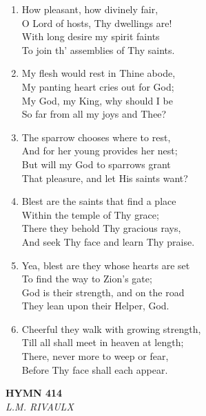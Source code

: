 \documentclass[11pt,a4paper]{article}
\begin{document}
\begin{enumerate}
    \item How pleasant, how divinely fair, \\
        O Lord of hosts, Thy dwellings are! \\
        With long desire my spirit faints \\
        To join th' assemblies of Thy saints.

    \item My flesh would rest in Thine abode, \\
        My panting heart cries out for God; \\
        My God, my King, why should I be \\
        So far from all my joys and Thee?

    \item The sparrow chooses where to rest, \\
        And for her young provides her nest; \\
        But will my God to sparrows grant \\
        That pleasure, and let His saints want?

    \item Blest are the saints that find a place \\
        Within the temple of Thy grace; \\
        There they behold Thy gracious rays, \\
        And seek Thy face and learn Thy praise.

    \item Yea, blest are they whose hearts are set \\
        To find the way to Zion's gate; \\
        God is their strength, and on the road \\
        They lean upon their Helper, God.

    \item Cheerful they walk with growing strength, \\
        Till all shall meet in heaven at length; \\
        There, never more to weep or fear, \\
        Before Thy face shall each appear.

\end{enumerate}

\newpage
\begin{center}
    {\Large \textbf{HYMN 414}}
    \\
    \textit{L.M. RIVAULX}
\end{center}
\vspace{1em}
\end{document}
